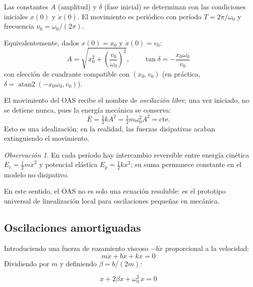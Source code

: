 \documentclass[12pt, a4paper]{article}
\theoremstyle{plain}
\theoremstyle{definition}
\theoremstyle{remark}
\newtheorem*{observacion}{Observación}
\begin{document}
Las constantes $A$ (amplitud) y $\delta$ (fase inicial) se determinan con las condiciones
iniciales $x(0)$ y $\dot{x}(0)$. El movimiento es periódico con período
$T = 2\pi/\omega_0$ y frecuencia $\nu_0 = \omega_0/(2\pi)$.

Equivalentemente, dados $x(0)=x_0$ y $\dot{x}(0)=v_0$:
\begin{equation}
  A=\sqrt{x_0^2+\left(\frac{v_0}{\omega_0}\right)^2},
  \qquad
  \tan\delta=-\frac{x_0\omega_0}{v_0}
\end{equation}
con elección de cuadrante compatible con $(x_0,v_0)$ (en práctica,
$\delta=\operatorname{atan2}(-x_0\omega_0,v_0)$).

El movimiento del OAS recibe el nombre de \emph{oscilación libre}: una vez iniciado, no
se detiene nunca, pues la energía mecánica se conserva:
\begin{equation}
  E = \tfrac{1}{2}kA^2 = \tfrac{1}{2}m\omega_0^2 A^2 = \text{cte.}
\end{equation}
Esto es una idealización; en la realidad, las fuerzas disipativas acaban extinguiendo el
movimiento.
\begin{observacion}
En cada período hay intercambio reversible entre energía cinética
$E_c=\tfrac12 m\dot{x}^2$ y potencial elástica $E_p=\tfrac12 kx^2$; su suma permanece
constante en el modelo no disipativo.
\end{observacion}
En este sentido, el OAS no es solo una ecuación resoluble: es el prototipo universal de
linealización local para oscilaciones pequeñas en mecánica.

\subsection{Oscilaciones amortiguadas}

Introduciendo una fuerza de rozamiento viscoso $-b\dot{x}$ proporcional a la velocidad:
\begin{equation}
  m\ddot{x} + b\dot{x} + kx = 0
\end{equation}
Dividiendo por $m$ y definiendo $\beta = b/(2m)$:
\begin{mdframed}[style=resultado]
\begin{equation}
  \ddot{x} + 2\beta\dot{x} + \omega_0^2\,x = 0
\end{equation}
\end{mdframed}
\end{document}

